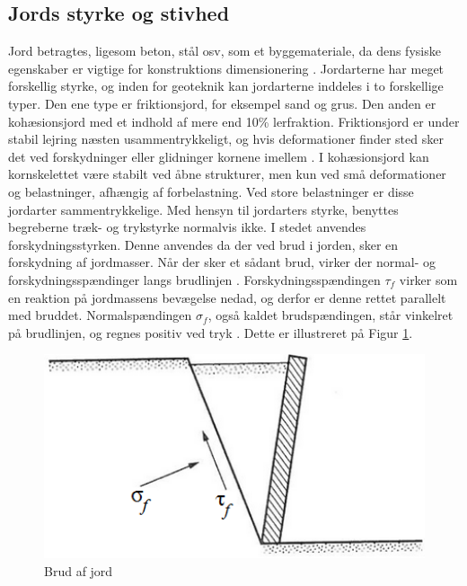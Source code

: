 \subsection{Jords styrke og stivhed}
Jord betragtes, ligesom beton, stål osv, som et byggemateriale, da dens fysiske egenskaber er vigtige for konstruktions dimensionering \citep{DGF}.
\newline \indent{     }  Jordarterne har meget forskellig styrke, og inden for geoteknik kan jordarterne inddeles i to forskellige typer. Den ene type er friktionsjord, for eksempel sand og grus. Den anden er kohæsionsjord med et indhold af mere end 10\% lerfraktion. 
Friktionsjord er under stabil lejring næsten usammentrykkeligt, og hvis deformationer finder sted sker det ved forskydninger eller glidninger kornene imellem \citep{DGF}.
\newline \indent{     }  I kohæsionsjord kan kornskelettet være stabilt ved åbne strukturer, men kun ved små deformationer og belastninger, afhængig af forbelastning. Ved store belastninger er disse jordarter sammentrykkelige.
\newline \indent{     }  Med hensyn til jordarters styrke, benyttes begreberne træk- og trykstyrke normalvis ikke. I stedet anvendes forskydningsstyrken. Denne anvendes da der ved brud i jorden, sker en forskydning af jordmasser. Når der sker et sådant brud, virker der normal- og forskydningsspændinger langs brudlinjen \citep{geoteknik}. Forskydningsspændingen $\tau_f$ virker som en reaktion på jordmassens bevægelse nedad, og derfor er denne rettet parallelt med bruddet. Normalspændingen $\sigma_f$, også kaldet brudspændingen, står vinkelret på brudlinjen, og regnes positiv ved tryk \citep{geoteknik}. Dette er illustreret på Figur \ref{fig:poretrykket}. 

\begin{figure}[htbp] \centering
	\begin{minipage}[b]{0.48\textwidth}\centering
		\includegraphics[width=1.0\textwidth]{billeder/poretrykket.png}
		\caption{Brud af jord \citep{geoteknik}}
		\label{fig:poretrykket}
	\end{minipage}\hfill
\end{figure}

